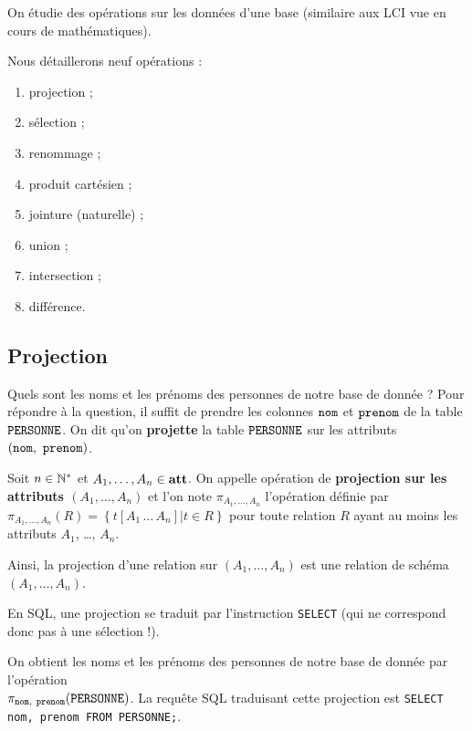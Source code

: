On étudie des opérations sur les données d'une base (similaire aux LCI vue en cours de mathématiques).

Nous détaillerons neuf opérations :
\begin{multicols}{3}
\begin{enumerate}
\item projection ;
\item sélection ;
\item renommage ;
\item produit cartésien ;
\item jointure (naturelle) ;
\item union ;
\item intersection ;
\item différence.
\end{enumerate}
\end{multicols}
\subsection{Projection}

Quels sont les noms et les prénoms des personnes de notre base de donnée ? Pour répondre à la question, il suffit de prendre les colonnes
$\mathtt{nom}$ et $\mathtt{prenom}$ de la table $\mathtt{PERSONNE}{}$. On dit qu'on \textbf{projette} la
table $\mathtt{PERSONNE}$ sur les attributs $(\mathtt{nom},\ \mathtt{prenom})$.

\begin{defi}[Projection]
  Soit $n\in \mathbb{N}^{*}$ et $A_{1}, \ldots{}, A_{n}\in
  \mathbf{att}$. On appelle opération de \textbf{projection sur les attributs
    $(A_{1}, \ldots, A_{n})$}
  et l'on note $\pi_{A_{1},\ldots,A_{n}}$ l'opération définie par$
    \pi_{A_{1},\ldots,A_{n}}(R) = \left\{t[A_{1}\,\ldots\,A_{n}] | t \in R \right\}$
  pour toute relation $R$ ayant au moins les attributs $A_{1}$,
  \ldots{}, $A_{n}$.
  
  Ainsi, la projection d'une relation sur $(A_{1}, \ldots{}, A_{n})$ est une relation de schéma $(A_1,\dots,A_n)$.
\end{defi}

En SQL, une projection se traduit par l'instruction \texttt{SELECT} (qui ne correspond donc pas à une sélection !). 
\begin{exemple}
  On obtient les noms et les prénoms des personnes de notre base de donnée par l'opération  \\
  $\pi_{\mathtt{nom},\ \mathtt{prenom}}(\mathtt{PERSONNE})$.   La requête SQL traduisant cette projection est 
\texttt{SELECT nom, prenom FROM PERSONNE;}.

\end{exemple}
